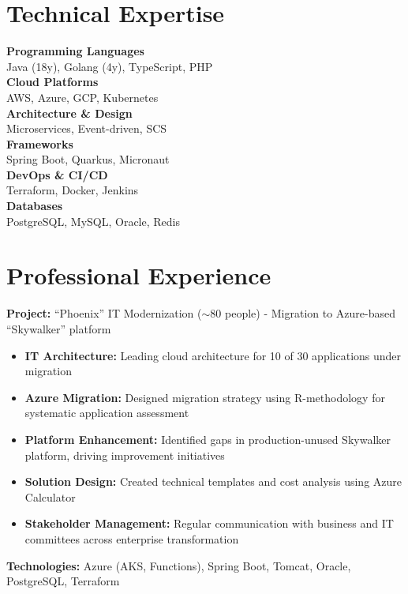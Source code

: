 \documentclass[11pt,a4paper,sans]{moderncv}
\begin{document}
\section{Technical Expertise}

\begin{multicols}{2}
\textbf{Programming Languages}\\
Java (18y), Golang (4y), TypeScript, PHP\\

\textbf{Cloud Platforms}\\
AWS, Azure, GCP, Kubernetes\\

\textbf{Architecture \& Design}\\
Microservices, Event-driven, SCS\\

\textbf{Frameworks}\\
Spring Boot, Quarkus, Micronaut\\

\textbf{DevOps \& CI/CD}\\
Terraform, Docker, Jenkins\\

\textbf{Databases}\\
PostgreSQL, MySQL, Oracle, Redis\\
\end{multicols}

\newpage

\section{Professional Experience}

{
\textbf{Project:} ``Phoenix'' IT Modernization ($\sim$80 people) - Migration to Azure-based ``Skywalker'' platform
\begin{itemize}[noitemsep,topsep=5pt]
\item \textbf{IT Architecture:} Leading cloud architecture for 10 of 30 applications under migration
\item \textbf{Azure Migration:} Designed migration strategy using R-methodology for systematic application assessment
\item \textbf{Platform Enhancement:} Identified gaps in production-unused Skywalker platform, driving improvement initiatives
\item \textbf{Solution Design:} Created technical templates and cost analysis using Azure Calculator
\item \textbf{Stakeholder Management:} Regular communication with business and IT committees across enterprise transformation
\end{itemize}
\textbf{Technologies:} Azure (AKS, Functions), Spring Boot, Tomcat, Oracle, PostgreSQL, Terraform
}
\end{document}
